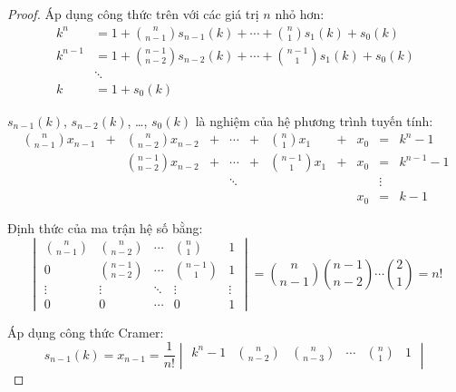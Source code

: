 \documentclass[class=nhvh-linear-algebra,crop=false]{standalone}
\begin{document}
\begin{proof}
    \par Áp dụng công thức trên với các giá trị $n$ nhỏ hơn:
    \begin{align*}
        k^{n}   & = 1 + \binom{n}{n-1}s_{n-1}(k) + \cdots + \binom{n}{1}s_{1}(k) + s_{0}(k)     \\
        k^{n-1} & = 1 + \binom{n-1}{n-2}s_{n-2}(k) + \cdots + \binom{n-1}{1}s_{1}(k) + s_{0}(k) \\
                & \ddots                                                                        \\
        k       & = 1 + s_{0}(k)
    \end{align*}
    \par $s_{n-1}(k)$, $s_{n-2}(k)$, \ldots, $s_{0}(k)$ là nghiệm của hệ phương trình tuyến tính:
    \[
        \begin{array}{ccccccccccc}
            \binom{n}{n-1}x_{n-1} & + & \binom{n}{n-2}x_{n-2}   & + & \cdots & + & \binom{n}{1}x_{1}   & + & x_{0} & =      & k^{n} - 1   \\
                                  &   & \binom{n-1}{n-2}x_{n-2} & + & \cdots & + & \binom{n-1}{1}x_{1} & + & x_{0} & =      & k^{n-1} - 1 \\
                                  &   &                         &   & \ddots &   &                     &   &       & \vdots &             \\
                                  &   &                         &   &        &   &                     &   & x_{0} & =      & k - 1
        \end{array}
    \]
    \par Định thức của ma trận hệ số bằng:
    \[
        \begin{vmatrix}
            \binom{n}{n-1} & \binom{n}{n-2}   & \cdots & \binom{n}{1}   & 1      \\
            0              & \binom{n-1}{n-2} & \cdots & \binom{n-1}{1} & 1      \\
            \vdots         & \vdots           & \ddots & \vdots         & \vdots \\
            0              & 0                & \cdots & 0              & 1
        \end{vmatrix}
        = \binom{n}{n-1}\binom{n-1}{n-2}\cdots\binom{2}{1}
        = n!
    \]
    \par Áp dụng công thức Cramer:
    \[
        s_{n-1}(k) = x_{n-1} = \dfrac{1}{n!}
        \begin{vmatrix}
            k^{n} - 1   & \binom{n}{n-2} & \binom{n}{n-3}   & \cdots & \binom{n}{1}   & 1      \\

\end{vmatrix}\]
\end{proof}
\end{document}
